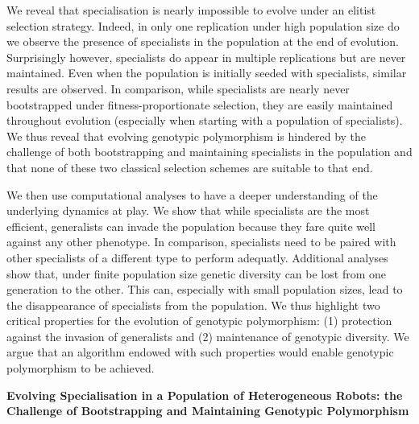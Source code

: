 We reveal that specialisation is nearly impossible to evolve under an elitist selection strategy. Indeed, in only one replication under high population size do we observe the presence of specialists in the population at the end of evolution. Surprisingly however, specialists do appear in multiple replications but are never maintained. Even when the population is initially seeded with specialists, similar results are observed. In comparison, while specialists are nearly never bootstrapped under fitness-proportionate selection, they are easily maintained throughout evolution (especially when starting with a population of specialists). We thus reveal that evolving genotypic polymorphism is hindered by the challenge of both bootstrapping and maintaining specialists in the population and that none of these two classical selection schemes are suitable to that end.

We then use computational analyses to have a deeper understanding of the underlying dynamics at play. We show that while specialists are the most efficient, generalists can invade the population because they fare quite well against any other phenotype. In comparison, specialists need to be paired with other specialists of a different type to perform adequatly. Additional analyses show that, under finite population size genetic diversity can be lost from one generation to the other. This can, especially with small population sizes, lead to the disappearance of specialists from the population. We thus highlight two critical properties for the evolution of genotypic polymorphism: (1) protection against the invasion of generalists and (2) maintenance of genotypic diversity. We argue that an algorithm endowed with such properties would enable genotypic polymorphism to be achieved.

\clearpage

\begin{flushleft}
\textbf{\Huge Evolving Specialisation in a Population of Heterogeneous Robots: the Challenge of Bootstrapping and Maintaining Genotypic Polymorphism}
\end{flushleft}


